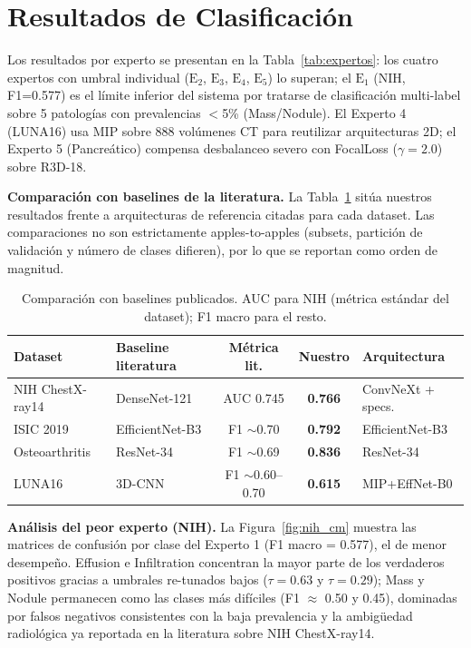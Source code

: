 \documentclass[11pt, a4paper]{article}
\begin{document}
\section{Resultados de Clasificación}

Los resultados por experto se presentan en la Tabla~\ref{tab:expertos}:
los cuatro expertos con umbral individual ($\text{E}_2$, $\text{E}_3$,
$\text{E}_4$, $\text{E}_5$) lo superan; el $\text{E}_1$ (NIH, F1=0.577)
es el límite inferior del sistema por tratarse de clasificación
multi-label sobre 5 patologías con prevalencias $<$5\% (Mass/Nodule).
El Experto 4 (LUNA16) usa MIP sobre 888 volúmenes CT para reutilizar
arquitecturas 2D; el Experto 5 (Pancreático) compensa desbalanceo severo
con FocalLoss ($\gamma=2.0$) sobre R3D-18.

\textbf{Comparación con baselines de la literatura.} La
Tabla~\ref{tab:baselines} sitúa nuestros resultados frente a arquitecturas
de referencia citadas para cada dataset. Las comparaciones no son
estrictamente apples-to-apples (subsets, partición de validación y número
de clases difieren), por lo que se reportan como orden de magnitud.

\begin{table}[H]
\centering
\caption{Comparación con baselines publicados. AUC para NIH (métrica estándar del dataset); F1 macro para el resto.}
\label{tab:baselines}
\footnotesize
\setlength{\tabcolsep}{4pt}
\begin{tabular}{llccl}
\toprule
\textbf{Dataset} & \textbf{Baseline literatura} & \textbf{Métrica lit.} & \textbf{Nuestro} & \textbf{Arquitectura} \\
\midrule
NIH ChestX-ray14 & DenseNet-121 \cite{wang2017chestxray}        & AUC 0.745 & \textbf{0.766} & ConvNeXt + specs. \\
ISIC 2019        & EfficientNet-B3 \cite{tan2019efficientnet}   & F1 $\sim$0.70 & \textbf{0.792} & EfficientNet-B3 \\
Osteoarthritis   & ResNet-34 \cite{tiulpin2018automatic}        & F1 $\sim$0.69 & \textbf{0.836} & ResNet-34 \\
LUNA16           & 3D-CNN \cite{armato2011luna}                 & F1 $\sim$0.60--0.70 & \textbf{0.615} & MIP+EffNet-B0 \\
\bottomrule
\end{tabular}
\end{table}

\textbf{Análisis del peor experto (NIH).} La Figura~\ref{fig:nih_cm} muestra
las matrices de confusión por clase del Experto 1 (F1 macro = 0.577),
el de menor desempeño. Effusion e Infiltration concentran la mayor parte
de los verdaderos positivos gracias a umbrales re-tunados bajos
($\tau=0.63$ y $\tau=0.29$); Mass y Nodule permanecen como las clases más
difíciles (F1 $\approx$ 0.50 y 0.45), dominadas por falsos negativos
consistentes con la baja prevalencia y la ambigüedad radiológica ya
reportada en la literatura sobre NIH ChestX-ray14.
\end{document}
